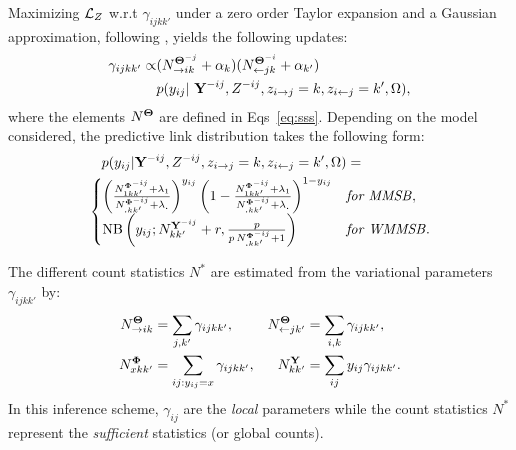 Maximizing $\mathcal{L}_Z$ w.r.t $\gamma_{ijkk'}$ under a zero order Taylor expansion and a Gaussian approximation, following \cite{teh2007collapsed,asuncion2009smoothing}, yields the following updates:
%
\begin{align} \label{eq:maximization}
\gamma_{ijkk'} \propto &(N_{\rightarrow ik}^{{\Bs{\Theta}}^{-j}} + \alpha_k) (N_{\leftarrow jk}^{{\Bs{\Theta}}^{-i}} + \alpha_{k'}) \nonumber\\
  &p(y_{ij} | {\B{Y}}^{-ij}, Z^{- ij}, \zij=k, \zji=k',\Omega),
\end{align}
%
where the elements $N^{{\boldsymbol{\Theta}}}$ are defined in Eqs~\eqref{eq:sss}. Depending on the model considered, the predictive link distribution
takes the following form:
%
\begin{align*}
&\quad p(y_{ij} | {\B{Y}}^{-ij}, Z^{- ij}, \zij=k, \zji=k',\Omega) = \\
&\begin{cases}
    \left( \frac{ N^{{\Bs{\Phi}}^{-ij}}_{1 kk'} + \lambda_1}{N^{{\Bs{\Phi}}^{-ij}}_{\bm{.}kk'} + \lambda_{\bm{.}}}\right)^{y_{ij}} \left( 1- \frac{ N^{{\Bs{\Phi}}^{-ij}}_{1 kk'} + \lambda_1}{N^{{\Bs{\Phi}}^{-ij}}_{\bm{.}kk'} + \lambda_{\bm{.}}}\right)^{1-y_{ij}}  & \textrm{\textit{for MMSB}}, \\
    \mathrm{NB}\left(y_{ij}; N^{{\B{Y}}^{-ij}}_{kk'} + r, \frac{p}{p\,N^{{\Bs{\Phi}}^{-ij}}_{\bm{.}kk'} + 1} \right) & \textrm{\textit{for WMMSB}}. %
\end{cases}
\end{align*}

The different count statistics $N^*$ are estimated from the variational parameters $\gamma_{ijkk'}$ by:
%
\begin{align} \label{eq:sss}
    N^{{\boldsymbol{\Theta}}}_{\rightarrow ik} &= \sum_{j, k'} \gamma_{ijkk'},       & N^{{\boldsymbol{\Theta}}}_{\leftarrow jk'} &= \sum_{i, k} \gamma_{ijkk'},  \nonumber \\
    N^{{\boldsymbol{\Phi}}}_{xkk'} &= \sum_{ij:y_{ij}=x} \gamma_{ijkk'},  & N^{{\mathbf{Y}}}_{kk'} &= \sum_{ij} y_{ij}\gamma_{ijkk'}.
\end{align}
%
In this inference scheme, $\gamma_{ij}$ are the \emph{local} parameters while the count statistics $N^*$ represent the \emph{sufficient} statistics (or global counts).

